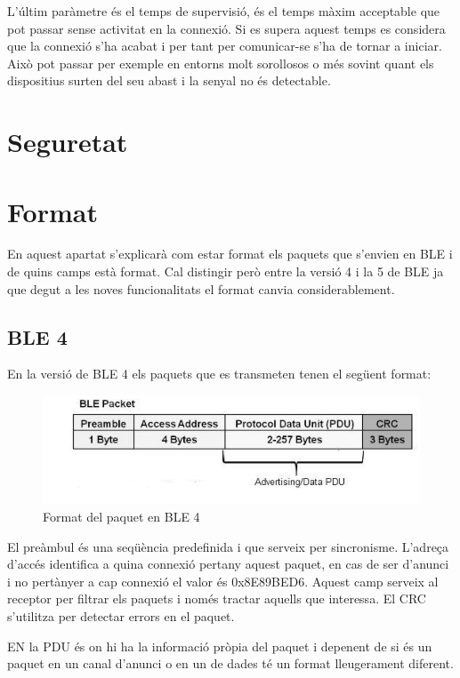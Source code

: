 L'últim paràmetre és el temps de supervisió, és el temps màxim acceptable que pot passar sense activitat en la connexió.
Si es supera aquest temps es considera que la connexió s'ha acabat i per tant per comunicar-se s'ha de tornar a iniciar.
Això pot passar per exemple en entorns molt sorollosos o més sovint quant els dispositius surten del seu abast i la senyal no és detectable.

\section{Seguretat}

\section{Format}
En aquest apartat s'explicarà com estar format els paquets que s'envien en BLE i de quins camps està format.
Cal distingir però entre la versió 4 i la 5 de BLE ja que degut a les noves funcionalitats el format canvia considerablement.

\subsection{BLE 4}
En la versió de BLE 4 els paquets que es transmeten tenen el següent format:

\begin{figure}[!h]
	\begin{center}
		\includegraphics[width=1\textwidth]{./images/Packet_format_4_2.png}
		\caption{Format del paquet en BLE 4}
	\end{center}
\end{figure}

El preàmbul és una seqüència predefinida i que serveix per sincronisme.
L'adreça d'accés identifica a quina connexió pertany aquest paquet, en cas de ser d'anunci i no pertànyer a cap connexió el valor és 0x8E89BED6.
Aquest camp serveix al receptor per filtrar els paquets i només tractar aquells que interessa.
El CRC s'utilitza per detectar errors en el paquet. 

EN la PDU és on hi ha la informació pròpia del paquet i depenent de si és un paquet en un canal d'anunci o en un de dades té un format lleugerament diferent.

